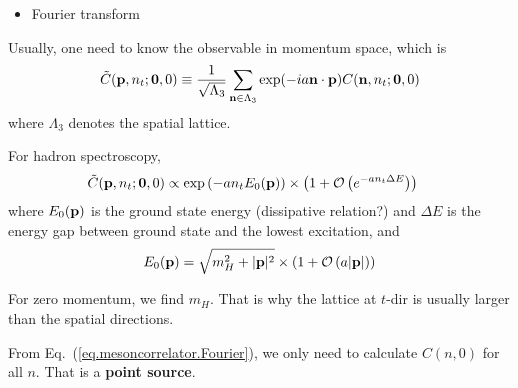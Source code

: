 \begin{itemize}
  \item Fourier transform
\end{itemize}

Usually, one need to know the observable in momentum space, which is
\begin{equation}
\begin{split}
&\tilde{C}({\bf p},n_t;{\bf 0}, 0)\equiv \frac{1}{\sqrt{\Lambda _3}}\sum _{{\bf n}\in \Lambda _3}\exp (-ia {\bf n}\cdot {\bf p})C({\bf n},n_t;{\bf 0},0)\\
\end{split}
\label{eq.mesoncorrelator.Fourier}
\end{equation}
where $\Lambda _3$ denotes the spatial lattice.

For hadron spectroscopy,
\begin{equation}
\begin{split}
&\tilde{C}({\bf p},n_t;{\bf 0}, 0)\propto \exp\left(-an_tE_0({\bf p})\right)\times \left(1+\mathcal{O}\left(e^{-an_t\Delta E}\right)\right)
\end{split}
\end{equation}
where $E_0({\bf p})$ is the ground state energy (dissipative relation?) and $\Delta E$ is the energy gap between ground state and the lowest excitation, and
\begin{equation}
\begin{split}
&E_0({\bf p})=\sqrt{m_H^2+|{\bf p}|^2}\times \left(1+\mathcal{O}\left(a|{\bf p}|\right)\right)\\
\end{split}
\end{equation}

For zero momentum, we find $m_H$. That is why the lattice at $t$-dir is usually larger than the spatial directions.

From Eq.~(\ref{eq.mesoncorrelator.Fourier}), we only need to calculate $C(n,0)$ for all $n$. That is a \textbf{point source}.

